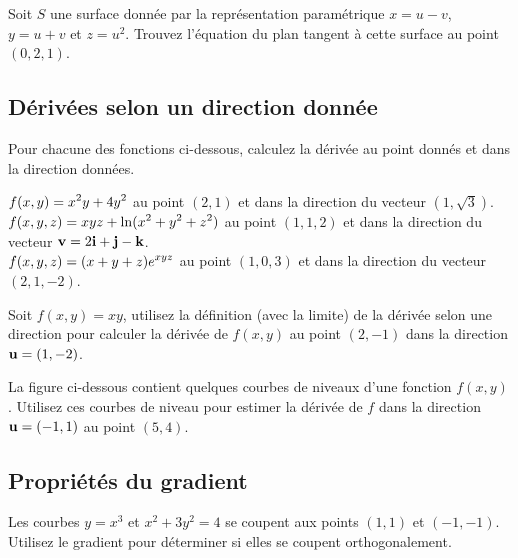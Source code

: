 \begin{question}[\eng]
Soit $S$ une surface donnée par la représentation paramétrique
$x = u - v$, $y = u + v$ et $z = u^2$.  Trouvez l'équation du plan
tangent à cette surface au point $(0,2,1)$.
\label{15Q9}
\end{question}

\subsection{Dérivées selon un direction donnée}

\begin{question}[\eng]
Pour chacune des fonctions ci-dessous, calculez la dérivée au point
donnés et dans la direction données.

 $\displaystyle f(x,y)=x^2y+4y^2$ au point $(2,1)$ et dans la
direction du vecteur $(1,\sqrt{3})$. \\
 $\displaystyle f(x,y,z) = xyz + \ln(x^2+y^2+z^2)$ au point
$(1,1,2)$ et dans la direction du vecteur
$\displaystyle \mathbf{v} = 2\mathbf{i} + \mathbf{j} - \mathbf{k}$.\\
 $\displaystyle f(x,y,z) = (x+y+z) e^{xyz}$ au point $(1,0,3)$
et dans la direction du vecteur $(2,1,-2)$.
\label{15Q10}
\end{question}

\begin{question}[\eng]
Soit $f(x,y) = xy$, utilisez la définition (avec la
limite) de la dérivée selon une direction pour calculer la dérivée
de $f(x,y)$ au point $(2,-1)$ dans la direction $\mathbf{u} = (1,-2)$.
\label{15Q11}
\end{question}

\begin{question}[\eng]
La figure ci-dessous contient quelques courbes de niveaux d'une
fonction $f(x,y)$.  Utilisez ces courbes de niveau pour estimer la
dérivée de $f$ dans la direction $\mathbf{u} = (-1,1)$ au point $(5,4)$. 
\label{15Q12}
\end{question}

\subsection{Propriétés du gradient}

\begin{question}[\eng]
Les courbes $y =x^3$ et $x^2 + 3 y^2 = 4$ se coupent aux points $(1,1)$
et $(-1,-1)$.  Utilisez le gradient pour déterminer si elles se
coupent orthogonalement.
\label{15Q13}
\end{question}

